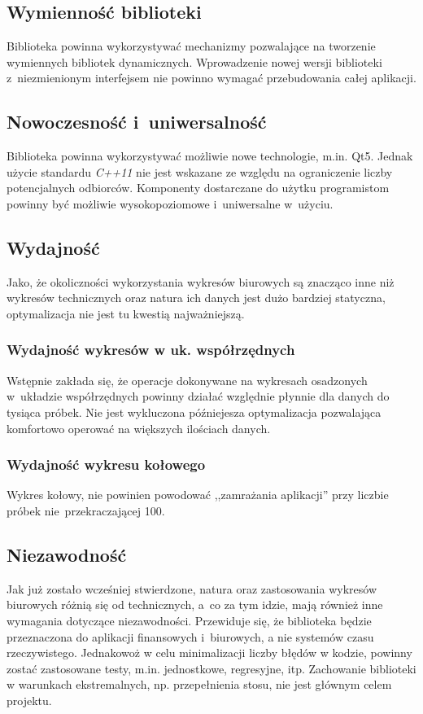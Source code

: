 \documentclass[11pt,twoside,a4paper,final]{article}
\begin{document}
\subsection{Wymienność biblioteki}
Biblioteka powinna wykorzystywać mechanizmy pozwalające na tworzenie wymiennych bibliotek dynamicznych. Wprowadzenie nowej wersji biblioteki z~niezmienionym interfejsem nie powinno wymagać przebudowania całej aplikacji.

\subsection{Nowoczesność i~uniwersalność}
Biblioteka powinna wykorzystywać możliwie nowe technologie, m.in. Qt5. Jednak użycie standardu \textit{C++11} nie jest wskazane ze względu na ograniczenie liczby potencjalnych odbiorców. Komponenty dostarczane do użytku programistom powinny być możliwie wysokopoziomowe i~uniwersalne w~użyciu.

\subsection{Wydajność}
Jako, że okoliczności wykorzystania wykresów biurowych są znacząco inne niż wykresów technicznych oraz natura ich danych jest dużo bardziej statyczna, optymalizacja nie jest tu kwestią najważniejszą. 

\subsubsection{Wydajność wykresów w uk. współrzędnych}
Wstępnie zakłada się, że operacje dokonywane na wykresach osadzonych w~układzie współrzędnych powinny działać względnie płynnie dla danych do tysiąca próbek. Nie jest wykluczona późniejesza optymalizacja
pozwalająca komfortowo operować na większych ilościach danych.

\subsubsection{Wydajność wykresu kołowego}
Wykres kołowy, nie powinien powodować ,,zamrażania aplikacji'' przy liczbie próbek nie~przekraczającej 100. 

\subsection{Niezawodność}
Jak już zostało wcześniej stwierdzone, natura oraz zastosowania wykresów biurowych różnią się od technicznych, a~co za tym idzie, mają również inne wymagania dotyczące niezawodności. Przewiduje się, że biblioteka będzie przeznaczona do aplikacji finansowych i~biurowych, a nie systemów czasu rzeczywistego. Jednakowoż w celu minimalizacji liczby błędów w kodzie, powinny zostać zastosowane testy, m.in. jednostkowe, regresyjne, itp. Zachowanie biblioteki w warunkach ekstremalnych, np. przepełnienia stosu, nie jest głównym celem projektu.
\end{document}
